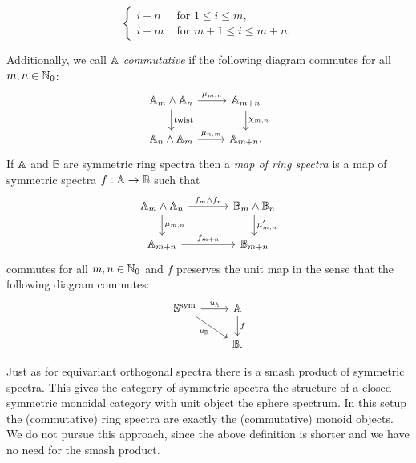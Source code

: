 \begin{mydef}
\begin{enumerate}[(i)]
\[\begin{cases}
i+n &\text{ for } 1\le i\le m,\\
i-m &\text{ for } m+1\le i\le m+n.
\end{cases}
\]
\end{enumerate}
Additionally, we call $\mathbb{A}$ \textit{commutative} if the following diagram commutes for all $m,n\in \mathbb{N}_0$:
\[
\begin{tikzcd}
\A_m\wedge \A_n
\arrow{r}{\mu_{m,n}}\arrow{d}{\mathrm{twist}}
&\A_{m+n}\arrow{d}{\chi_{m,n}}\\
\A_n\wedge \A_m\arrow{r}{\mu_{n,m}}
&\A_{m+n}.
\end{tikzcd}
\]
If $\mathbb{A}$ and $\mathbb{B}$ are symmetric ring spectra then a \textit{map of ring spectra}
is a map of symmetric spectra $f:\mathbb{A}\to \mathbb{B}$ such that
\[
\begin{tikzcd}[column sep = large]
\A_m\wedge \A_n
\arrow{r}{f_m\wedge f_n}\arrow{d}{\mu_{m,n}}
&\mathbb{B}_m\wedge \mathbb{B}_n\arrow{d}{\mu'_{m,n}}\\
\A_{m+n}\arrow{r}{f_{m+n}}
&\mathbb{B}_{m+n}
\end{tikzcd}
\]
commutes for all $m,n\in \mathbb{N}_0$ and $f$ preserves the unit map
in the sense that the following diagram commutes:
\[
\begin{tikzcd}
\spherespectrum^{\mathrm{sym}}
\arrow{r}{u_\A}\arrow[swap]{dr}{u_\mathbb{B}}
&\A\arrow{d}{f}\\
&\mathbb{B}.
\end{tikzcd}
\]
\end{mydef}

\begin{rem}
Just as for equivariant orthogonal spectra there is a smash product of symmetric spectra.
This gives the category of symmetric spectra the structure of a closed symmetric monoidal category
with unit object the sphere spectrum. In this setup the (commutative) ring spectra are exactly the
(commutative) monoid objects. We do not pursue this approach, since the above definition
is shorter and we have no need for the smash product.
\end{rem}

